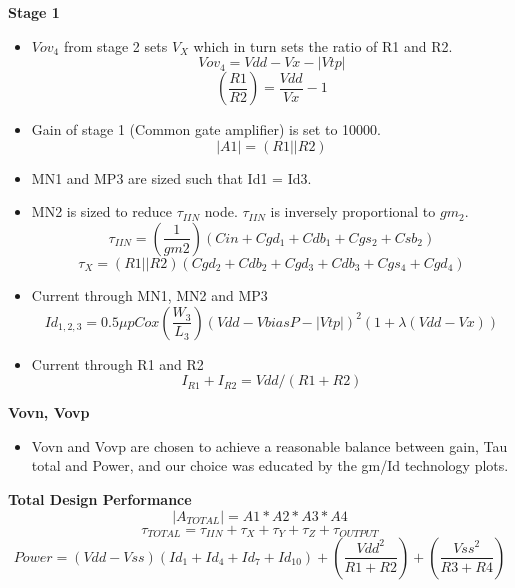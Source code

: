\documentclass[12pt,a4paper]{article}
\begin{document}
\textbf{Stage 1}

\begin{itemize}
	\item $Vov_4$ from stage 2 sets $V_X$ which in turn sets the ratio of R1 and R2.
	\begin{equation}
		Vov_4=Vdd-Vx-|Vtp|
	\end{equation}
	\begin{equation}
		(\frac{R1}{R2})=\frac{Vdd}{Vx}-1
	\end{equation}
	\item Gain of stage 1 (Common gate amplifier) is set to 10000.
	\begin{equation}
		|A1|=(R1 || R2)
	\end{equation}
	\item MN1 and MP3 are sized such that Id1 = Id3.
	\item MN2 is sized to reduce $\tau_{IIN}$ node.  $\tau_{IIN}$ is inversely proportional to $gm_2$.
	\begin{equation}
		\tau_{IIN}=(\frac{1}{gm2})(Cin+Cgd_1+Cdb_1+Cgs_2+Csb_2)
	\end{equation}
	\begin{equation}
		\tau_{X}=(R1 || R2)(Cgd_2+Cdb_2+Cgd_3+Cdb_3+Cgs_4+Cgd_4)
	\end{equation}
\end{itemize}





\begin{itemize}
	\item Current through MN1, MN2 and MP3
	\begin{equation}
		Id_{1,2,3}=0.5\mu pCox(\frac{W_3}{L_3})(Vdd-VbiasP-|Vtp|)^{2} (1+\lambda (Vdd-Vx))
	\end{equation}
	\item Current through R1 and R2
	\begin{equation}
		I_{R1}+I_{R2}=Vdd/(R1+R2)
	\end{equation}
\end{itemize}

\textbf{Vovn, Vovp}

\begin{itemize}
	\item Vovn and Vovp are chosen to achieve a reasonable balance between gain, Tau total and Power, and our choice was educated by the gm/Id technology plots.
\end{itemize}
\textbf{Total Design Performance}
\begin{equation}
	|A_{TOTAL}|=A1* A2* A3* A4
\end{equation}
\begin{equation}
	\tau_{TOTAL}=\tau_{IIN}+\tau_X+\tau_Y+\tau_Z+\tau_{OUTPUT}
\end{equation}
\begin{equation}
	Power=(Vdd-Vss)(Id_1+Id_4+Id_7+Id_{10})+(\frac{Vdd^{2}}{R1+R2})+(\frac{Vss^{2}}{R3+R4})
\end{equation}
\end{document}
